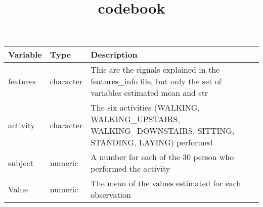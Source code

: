 \documentclass[
]{article}
\title{codebook}
\author{}
\date{\vspace{-2.5em}}
\begin{document}
\maketitle

\begin{longtable}[]{@{}lll@{}}
\toprule
\begin{minipage}[b]{0.30\columnwidth}\raggedright
Variable\strut
\end{minipage} & \begin{minipage}[b]{0.27\columnwidth}\raggedright
Type\strut
\end{minipage} & \begin{minipage}[b]{0.34\columnwidth}\raggedright
Description\strut
\end{minipage}\tabularnewline
\midrule
\endhead
\begin{minipage}[t]{0.30\columnwidth}\raggedright
features\strut
\end{minipage} & \begin{minipage}[t]{0.27\columnwidth}\raggedright
character\strut
\end{minipage} & \begin{minipage}[t]{0.34\columnwidth}\raggedright
This are the signals explained in the features\_info file, but only the
set of variables estimated mean and str\strut
\end{minipage}\tabularnewline
\begin{minipage}[t]{0.30\columnwidth}\raggedright
activity\strut
\end{minipage} & \begin{minipage}[t]{0.27\columnwidth}\raggedright
character\strut
\end{minipage} & \begin{minipage}[t]{0.34\columnwidth}\raggedright
The six activities (WALKING, WALKING\_UPSTAIRS, WALKING\_DOWNSTAIRS,
SITTING, STANDING, LAYING) performed\strut
\end{minipage}\tabularnewline
\begin{minipage}[t]{0.30\columnwidth}\raggedright
subject\strut
\end{minipage} & \begin{minipage}[t]{0.27\columnwidth}\raggedright
numeric\strut
\end{minipage} & \begin{minipage}[t]{0.34\columnwidth}\raggedright
A number for each of the 30 person who performed the activity\strut
\end{minipage}\tabularnewline
\begin{minipage}[t]{0.30\columnwidth}\raggedright
Value\strut
\end{minipage} & \begin{minipage}[t]{0.27\columnwidth}\raggedright
numeric\strut
\end{minipage} & \begin{minipage}[t]{0.34\columnwidth}\raggedright
The mean of the values estimated for each observation\strut
\end{minipage}\tabularnewline
\bottomrule
\end{longtable}
\end{document}
